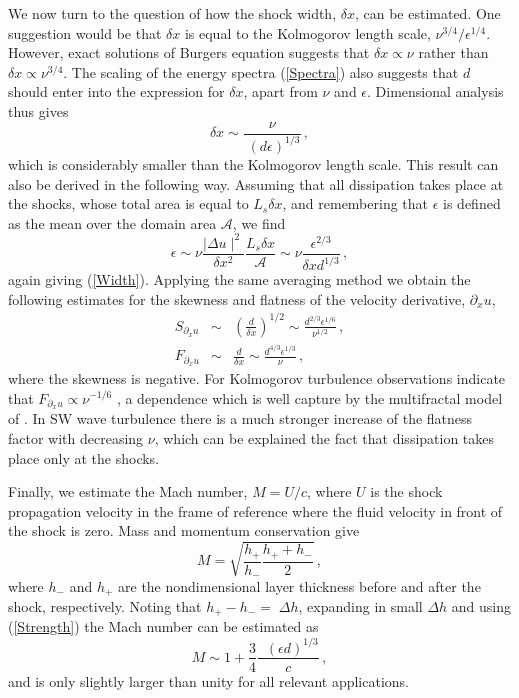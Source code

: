 We now turn to the question of how the shock width, $ \delta x $, can be estimated. One suggestion would be that $ \delta x $  is equal to the Kolmogorov length scale, $ \nu^{3/4}/\epsilon^{1/4} $. However, exact solutions of Burgers equation \cite[see for example][]{Whitham}
suggests that  $ \delta x \propto \nu $ rather than $ \delta x \propto \nu ^{3/4} $. The scaling of the energy spectra (\ref{Spectra}) also suggests that $ d $ should enter into the expression for $ \delta x$, apart from $ \nu $ and $ \epsilon $. Dimensional analysis thus gives
\begin{equation} \label{Width}
\delta x \sim \frac{\nu}{\; (d\epsilon)^{1/3}} \, ,
\end{equation} 
which is considerably smaller than the Kolmogorov length scale.
This result can also be derived in the following way. Assuming that all dissipation
takes place at the shocks, whose total area is equal to $ L_s \delta x $,  and
remembering that $ \epsilon $ is defined as the mean over the domain area $ \mathcal{A}$, we find
\begin{equation} \label{Estimate}
\epsilon \sim \nu \frac{ \mid \Delta u \mid ^{2} }{\delta x^2} \frac{L_s \delta x}{\mathcal{A}} \sim \nu \frac{\epsilon^{2/3}} {\delta x d^{1/3}} \, ,
\end{equation} 
again giving (\ref{Width}). 
Applying the same averaging method we obtain the following estimates for the skewness and flatness of the velocity derivative, $ \partial_x u $,
\begin{eqnarray}
S_{\partial_x u}  & \sim & \left ( \frac{d}{\delta x} \right )^{1/2} \sim \frac{d^{2/3} \epsilon ^{1/6}}{\nu^{1/2}} \, , \\
\label{FD} F_{\partial_x u} & \sim &  \frac{d}{\delta x} \sim \frac{d^{4/3} \epsilon^{1/3}} {\nu} \, ,
\end{eqnarray} 
where the skewness is negative. For Kolmogorov turbulence observations indicate that $ F_{\partial_x u} \propto \nu^{-1/6} $  \cite[]{VanAtta_Antonia1980}, a dependence which is well capture by the multifractal model of
\cite{Meneveau_Streenivasan1991}.  In SW wave turbulence there is a much stronger increase of  the flatness factor with decreasing  $ \nu $, which can be explained the fact that dissipation takes place only at the shocks.

Finally, we estimate the Mach number, $ M = U/c $, where $ U $ is the shock propagation velocity in the frame of reference where the fluid velocity in front of the shock is zero. 
Mass and momentum conservation give \cite[see][]{Baines1998} 
\begin{equation}
M = \sqrt{\frac{h_+}{h_-} \frac{h_+  + h_-}{2}} \, ,
\end{equation} 
where $ h_- $ and $ h_+ $ are the nondimensional layer thickness before and after the shock, respectively. Noting that $ h_+ - h_- =  \;  \Delta h  $, expanding in small $ \Delta h  $ and using (\ref{Strength}) the Mach number can be estimated as
\begin{equation} \label{Mach}
M \sim 1 + \frac{3}{4} \frac{\;\; (\epsilon d)^{1/3}}{c} \, ,
\end{equation} 
and is only slightly larger than unity for all relevant applications.

